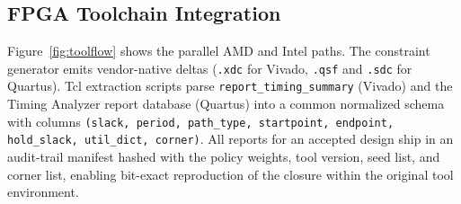 \documentclass[journal,onecolumn=false]{IEEEtran}
\begin{document}
\subsection{FPGA Toolchain Integration}
Figure~\ref{fig:toolflow} shows the parallel AMD and Intel paths. The constraint generator emits vendor-native deltas (\texttt{.xdc} for Vivado, \texttt{.qsf} and \texttt{.sdc} for Quartus). Tcl extraction scripts parse \texttt{report\_timing\_summary} (Vivado) and the Timing Analyzer report database (Quartus) into a common normalized schema with columns \texttt{(slack, period, path\_type, startpoint, endpoint, hold\_slack, util\_dict, corner)}. All reports for an accepted design ship in an audit-trail manifest hashed with the policy weights, tool version, seed list, and corner list, enabling bit-exact reproduction of the closure within the original tool environment.
\end{document}

